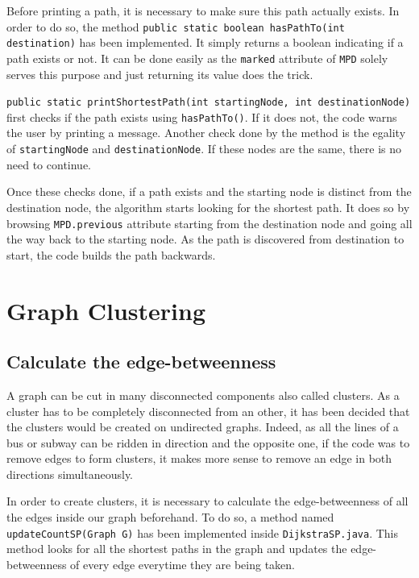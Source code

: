\documentclass{article}
\begin{document}
Before printing a path, it is necessary to make sure this path actually exists. In order to do so, the method \texttt{public static boolean hasPathTo(int destination)} has been implemented. It simply returns a boolean indicating if a path exists or not. It can be done easily as the \texttt{marked} attribute of \texttt{MPD} solely serves this purpose and just returning its value does the trick.

\texttt{public static printShortestPath(int startingNode, int destinationNode)} first checks if the path exists using \texttt{hasPathTo()}. If it does not, the code warns the user by printing a message. Another check done by the method is the egality of \texttt{startingNode} and \texttt{destinationNode}. If these nodes are the same, there is no need to continue.

Once these checks done, if a path exists and the starting node is distinct from the destination node, the algorithm starts looking for the shortest path. It does so by browsing \texttt{MPD.previous} attribute starting from the destination node and going all the way back to the starting node. As the path is discovered from destination to start, the code builds the path backwards.

\newpage

\section{Graph Clustering}

\subsection{Calculate the edge-betweenness}

A graph can be cut in many disconnected components also called clusters. As a cluster has to be completely disconnected from an other, it has been decided that the clusters would be created on undirected graphs. Indeed, as all the lines of a bus or subway can be ridden in direction and the opposite one, if the code was to remove edges to form clusters, it makes more sense to remove an edge in both directions simultaneously.

In order to create clusters, it is necessary to calculate the edge-betweenness of all the edges inside our graph beforehand. To do so, a method named \texttt{updateCountSP(Graph G)} has been implemented inside \texttt{DijkstraSP.java}. This method looks for all the shortest paths in the graph and updates the edge-betweenness of every edge everytime they are being taken.
\end{document}
